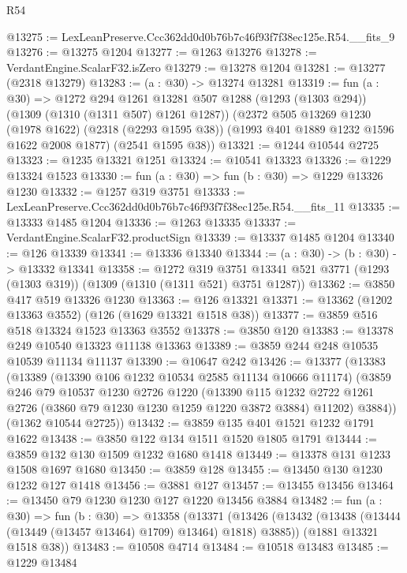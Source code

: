 \begin{lexlean}{R54}
\begin{coremodule}
@13275 := LexLeanPreserve.Ccc362dd0d0b76b7c46f93f7f38ec125e.R54.__fits_9
@13276 := @13275 @1204
@13277 := @1263 @13276
@13278 := VerdantEngine.ScalarF32.isZero
@13279 := @13278 @1204
@13281 := @13277 (@2318 @13279)
@13283 := (a : @30) -> @13274 @13281
@13319 := fun (a : @30) =>
  @1272
    @294
    @1261
    @13281
    @507
    @1288
    (@1293 (@1303 @294))
    (@1309 (@1310 (@1311 @507) @1261 @1287))
    (@2372
      @505
      @13269
      @1230
      (@1978 @1622)
      (@2318 (@2293 @1595 @38))
      (@1993 @401 @1889 @1232 @1596 @1622 @2008 @1877)
      (@2541 @1595 @38))
@13321 := @1244 @10544 @2725
@13323 := @1235 @13321 @1251
@13324 := @10541 @13323
@13326 := @1229 @13324 @1523
@13330 := fun (a : @30) => fun (b : @30) => @1229 @13326 @1230
@13332 := @1257 @319 @3751
@13333 := LexLeanPreserve.Ccc362dd0d0b76b7c46f93f7f38ec125e.R54.__fits_11
@13335 := @13333 @1485 @1204
@13336 := @1263 @13335
@13337 := VerdantEngine.ScalarF32.productSign
@13339 := @13337 @1485 @1204
@13340 := @126 @13339
@13341 := @13336 @13340
@13344 := (a : @30) -> (b : @30) -> @13332 @13341
@13358 := @1272
    @319
    @3751
    @13341
    @521
    @3771
    (@1293 (@1303 @319))
    (@1309 (@1310 (@1311 @521) @3751 @1287))
@13362 := @3850 @417 @519 @13326 @1230
@13363 := @126 @13321
@13371 := @13362 (@1202 @13363 @3552) (@126 (@1629 @13321 @1518 @38))
@13377 := @3859 @516 @518 @13324 @1523 @13363 @3552
@13378 := @3850 @120
@13383 := @13378 @249 @10540 @13323 @11138 @13363
@13389 := @3859 @244 @248 @10535 @10539 @11134 @11137
@13390 := @10647 @242
@13426 := @13377
    (@13383
      (@13389
        (@13390 @106 @1232 @10534 @2585 @11134 @10666 @11174)
        (@3859
          @246
          @79
          @10537
          @1230
          @2726
          @1220
          (@13390
            @115
            @1232
            @2722
            @1261
            @2726
            (@3860 @79 @1230 @1230 @1259 @1220 @3872 @3884)
            @11202)
          @3884))
      (@1362 @10544 @2725))
@13432 := @3859 @135 @401 @1521 @1232 @1791 @1622
@13438 := @3850 @122 @134 @1511 @1520 @1805 @1791
@13444 := @3859 @132 @130 @1509 @1232 @1680 @1418
@13449 := @13378 @131 @1233 @1508 @1697 @1680
@13450 := @3859 @128
@13455 := @13450 @130 @1230 @1232 @127 @1418
@13456 := @3881 @127
@13457 := @13455 @13456
@13464 := @13450 @79 @1230 @1230 @127 @1220 @13456 @3884
@13482 := fun (a : @30) =>
  fun (b : @30) =>
  @13358
    (@13371
      (@13426 (@13432 (@13438 (@13444 (@13449 (@13457 @13464) @1709) @13464) @1818) @3885))
      (@1881 @13321 @1518 @38))
@13483 := @10508 @4714
@13484 := @10518 @13483
@13485 := @1229 @13484

\end{coremodule}
\end{lexlean}
